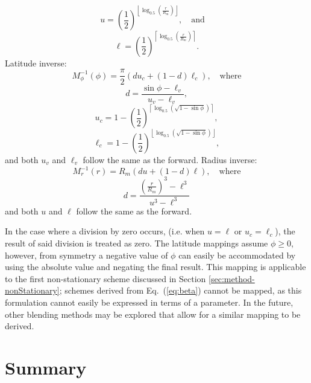 %
\begin{equation*}
u = \left( \frac{1}{2} \right)^{ \left\lfloor \log_{0.5} \left( \frac{r}{R_{m}} \right) \right\rfloor }, \quad \text{and} \quad
\end{equation*}
%
\begin{equation*}
\ell = \left( \frac{1}{2} \right)^{ \left\lceil \log_{0.5} \left( \frac{r}{R_{m}} \right) \right\rceil }.
\end{equation*}
%
%
Latitude inverse:
%
\begin{equation*}
M^{-1}_{\phi}(\phi) = \frac{\pi}{2} \left( d u_{c} + \left( 1 - d \right) \ell_{c} \right), \quad \text{where}
\end{equation*}
%
\begin{equation*}
d = \frac{\sin \phi - \ell_{v}}{u_{v} - \ell_{v}},
\end{equation*}
%
\begin{equation*}
u_{c} = 1 - \left( \frac{1}{2} \right)^{ \left\lceil \log_{0.5} \left( \sqrt{1 - \sin \phi} \right) \right\rceil },
\end{equation*}
%
\begin{equation*}
\ell_{c} = 1 - \left( \frac{1}{2} \right)^{ \left\lfloor \log_{0.5} \left( \sqrt{1 - \sin \phi} \right) \right\rfloor },
\end{equation*}
%
%
and both $u_{v}$ and $\ell_{v}$ follow the same as the forward.
Radius inverse:
%
\begin{equation*}
M^{-1}_{r}(r) = R_m \left( d u + \left( 1 - d \right) \ell \right), \quad \text{where}
\end{equation*}
%
\begin{equation*}
d = \frac{ \left( \frac{r}{R_{m}} \right)^{3} - \ell^{3}}{u^{3} - \ell^{3}}
\end{equation*}
%
and both $u$ and $\ell$ follow the same as the forward.


In the case where a division by zero occurs, (i.e. when $u = \ell$ or $u_{c} = \ell_{c}$), the result of said division is treated as zero.
The latitude mappings assume $\phi \ge 0$, however, from symmetry a negative value of $\phi$ can easily be accommodated by using the absolute value and negating the final result.
This mapping is applicable to the first non-stationary scheme discussed in Section \ref{sec:method-nonStationary}; schemes derived from Eq.~(\ref{eq:beta}) cannot be mapped, as this formulation cannot easily be expressed in terms of a parameter.
In the future, other blending methods may be explored that allow for a similar mapping to be derived.




\section{Summary}